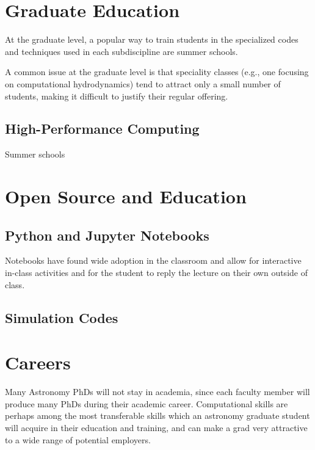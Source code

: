 \documentclass[11pt]{article}
\begin{document}
\section{Graduate Education}

At the graduate level, a popular way to train students in the specialized
codes and techniques used in each subdiscipline are summer schools.

A common issue at the graduate level is that speciality classes (e.g.,
one focusing on computational hydrodynamics) tend to attract only a
small number of students, making it difficult to justify their regular
offering.

\subsection{High-Performance Computing}

Summer schools


\section{Open Source and Education}

\subsection{Python and Jupyter Notebooks}

Notebooks have found wide adoption in the classroom and allow for
interactive in-class activities and for the student to reply the
lecture on their own outside of class.

\subsection{Simulation Codes}




\section{Careers}

Many Astronomy PhDs will not stay in academia, since each faculty member
will produce many PhDs during their academic career.  Computational skills are perhaps
among the most transferable skills which an astronomy graduate student will acquire
in their education and training, and
can make a grad very attractive to a wide range of potential employers.
\end{document}
